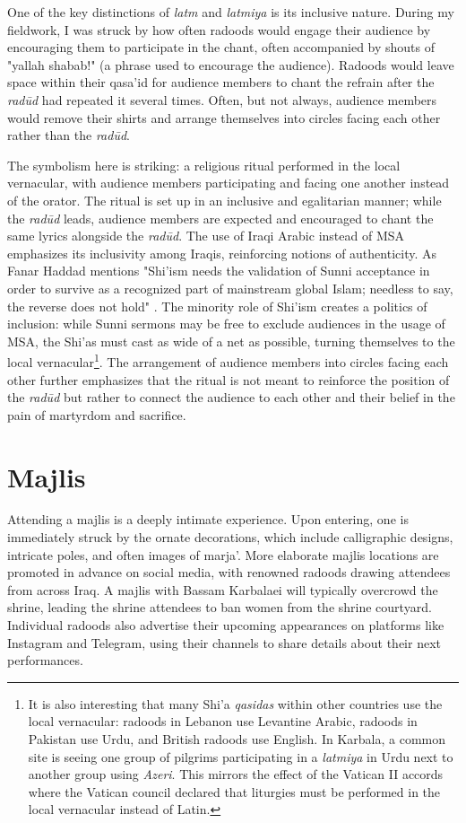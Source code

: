 One of the key distinctions of \emph{latm} and \emph{latmiya} is its inclusive nature. During my fieldwork, I was struck by how often radoods would engage their audience by encouraging them to participate in the chant, often accompanied by shouts of "yallah shabab!" (a phrase used to encourage the audience). Radoods would leave space within their qasa'id for audience members to chant the refrain after the \emph{radūd} had repeated it several times. Often, but not always, audience members would remove their shirts and arrange themselves into circles facing each other rather than the \emph{radūd}.

The symbolism here is striking: a religious ritual performed in the local vernacular, with audience members participating and facing one another instead of the orator. The ritual is set up in an inclusive and egalitarian manner; while the \emph{radūd} leads, audience members are expected and encouraged to chant the same lyrics alongside the \emph{radūd}. The use of Iraqi Arabic instead of MSA emphasizes its inclusivity among Iraqis, reinforcing notions of authenticity. As Fanar Haddad mentions "Shi'ism needs the validation of Sunni acceptance in order to survive as a recognized part of mainstream global Islam; needless to say, the reverse does not hold" \cite[179]{haddad_understanding_2020}. The minority role of Shi'ism creates a politics of inclusion: while Sunni sermons may be free to exclude audiences in the usage of MSA, the Shi'as must cast as wide of a net as possible, turning themselves to the local vernacular\footnote{It is also interesting that many Shi'a \emph{qasidas} within other countries use the local vernacular: radoods in Lebanon use Levantine Arabic, radoods in Pakistan use Urdu, and British radoods use English. In Karbala, a common site is seeing one group of pilgrims participating in a \emph{latmiya} in Urdu next to another group using \emph{Azeri}. This mirrors the effect of the Vatican II accords where the Vatican council declared that liturgies must be performed in the local vernacular instead of Latin.}. The arrangement of audience members into circles facing each other further emphasizes that the ritual is not meant to reinforce the position of the \emph{radūd} but rather to connect the audience to each other and their belief in the pain of martyrdom and sacrifice.

\section{Majlis}
Attending a majlis is a deeply intimate experience. Upon entering, one is immediately struck by the ornate decorations, which include calligraphic designs, intricate poles, and often images of marja'. More elaborate majlis locations are promoted in advance on social media, with renowned radoods drawing attendees from across Iraq. A majlis with Bassam Karbalaei will typically overcrowd the shrine, leading the shrine attendees to ban women from the shrine courtyard. Individual radoods also advertise their upcoming appearances on platforms like Instagram and Telegram, using their channels to share details about their next performances.


